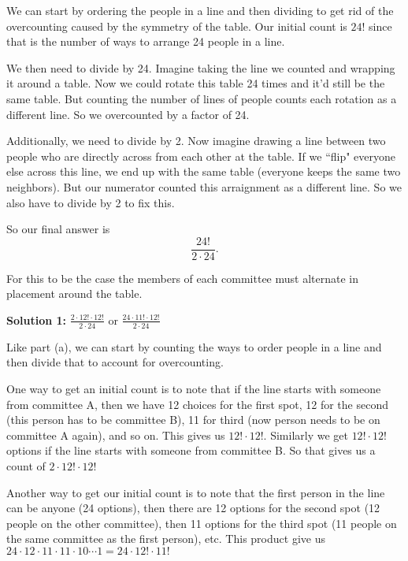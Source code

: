 \documentclass[12pt]{exam}
\begin{document}
\begin{solution}
\begin{qparts}
    \item We can start by ordering the people in a line and then dividing to get rid of the overcounting caused by the symmetry of the table. Our initial count is $24!$ since that is the number of ways to arrange 24 people in a line.
    
    We then need to divide by 24. Imagine taking the line we counted and wrapping it around a table. Now we could rotate this table 24 times and it'd still be the same table. But counting the number of lines of people counts each rotation as a different line. So we overcounted by a factor of 24.

    Additionally, we need to divide by 2. Now imagine drawing a line between two people who are directly across from each other at the table. If we ``flip" everyone else across this line, we end up with the same table (everyone keeps the same two neighbors). But our numerator counted this arraignment as a different line. So we also have to divide by 2 to fix this.

    So our final answer is
    $$\frac{24!}{2\cdot 24}.$$
    
    \item For this to be the case the members of each committee must alternate in placement around the table.
    
    \textbf{Solution 1:} $\frac{2\cdot 12!\cdot 12!}{2\cdot 24}$ or $\frac{24\cdot 11!\cdot 12!}{2\cdot 24}$
    
    Like part (a), we can start by counting the ways to order people in a line and then divide that to account for overcounting.
    
    One way to get an initial count is to note that if the line starts with someone from committee A, then we have 12 choices for the first spot, 12 for the second (this person has to be committee B), 11 for third (now person needs to be on committee A again), and so on. This gives us $12! \cdot 12!$. Similarly we get $12!\cdot 12!$ options if the line starts with someone from committee B. So that gives us a count of $2\cdot 12!\cdot 12!$

    Another way to get our initial count is to note that the first person in the line can be anyone (24 options), then there are 12 options for the second spot (12 people on the other committee), then 11 options for the third spot (11 people on the same committee as the first person), etc. This product give us $24\cdot 12\cdot 11\cdot 11\cdot 10\cdots 1 = 24\cdot 12!\cdot 11!$


\end{qparts}
\end{solution}
\end{document}
